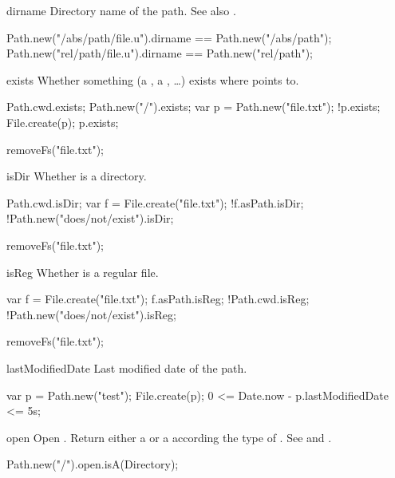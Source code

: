 \begin{urbiscriptapi}
\item[dirname]%
  Directory name of the path.  See also .
\begin{urbiassert}
Path.new("/abs/path/file.u").dirname == Path.new("/abs/path");
Path.new("rel/path/file.u").dirname  == Path.new("rel/path");
\end{urbiassert}


\item[exists]%
  Whether something (a , a , \ldots) exists
  where \this points to.
\begin{urbiassert}
Path.cwd.exists;
Path.new("/").exists;
var p = Path.new("file.txt");
!p.exists;
File.create(p);
p.exists;
\end{urbiassert}
\begin{urbicomment}
removeFs("file.txt");
\end{urbicomment}


\item[isDir]%
  Whether \this is a directory.
\begin{urbiassert}
Path.cwd.isDir;
var f = File.create("file.txt");
!f.asPath.isDir;
!Path.new("does/not/exist").isDir;
\end{urbiassert}
\begin{urbicomment}
removeFs("file.txt");
\end{urbicomment}


\item[isReg]%
  Whether \this is a regular file.
\begin{urbiassert}
var f = File.create("file.txt");
 f.asPath.isReg;
!Path.cwd.isReg;
!Path.new("does/not/exist").isReg;
\end{urbiassert}
\begin{urbicomment}
removeFs("file.txt");
\end{urbicomment}


\item[lastModifiedDate]%
  Last modified date of the path.
\begin{urbiassert}
var p = Path.new("test");
File.create(p);
0 <= Date.now - p.lastModifiedDate <= 5s;
\end{urbiassert}


\item[open] Open \this. Return either a  or a 
  according the type of \this. See  and
  .
\begin{urbiassert}
Path.new("/").open.isA(Directory);
\end{urbiassert}



\end{urbiscriptapi}
